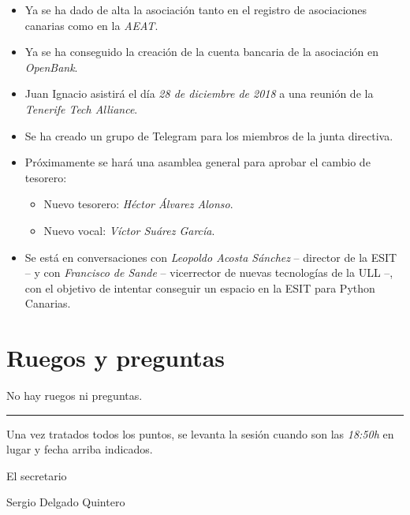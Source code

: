 \documentclass[a4paper, 12pt]{article}
\begin{document}
\begin{itemize}
    \item Ya se ha dado de alta la asociación tanto en el registro de asociaciones canarias como en la \textit{AEAT}.
    \item Ya se ha conseguido la creación de la cuenta bancaria de la asociación en \textit{OpenBank}.
    \item Juan Ignacio asistirá el día \textit{28 de diciembre de 2018} a una reunión de la \textit{Tenerife Tech Alliance}.
    \item Se ha creado un grupo de Telegram para los miembros de la junta directiva.
    \item Próximamente se hará una asamblea general para aprobar el cambio de tesorero:
    \begin{itemize}
        \item Nuevo tesorero: \textit{Héctor Álvarez Alonso}.
        \item Nuevo vocal: \textit{Víctor Suárez García}.
    \end{itemize}
    \item Se está en conversaciones con \textit{Leopoldo Acosta Sánchez} -- director de la ESIT -- y con \textit{Francisco de Sande} -- vicerrector de nuevas tecnologías de la ULL --, con el objetivo de intentar conseguir un espacio en la ESIT para Python Canarias.
\end{itemize}

\section{Ruegos y preguntas}

No hay ruegos ni preguntas.


\vspace{1cm}
\hrule
\vspace{3mm}

Una vez tratados todos los puntos, se levanta la sesión cuando son las \textit{18:50h} en lugar y fecha arriba indicados.

\begin{flushright}
El secretario

Sergio Delgado Quintero
\end{flushright}
\end{document}
